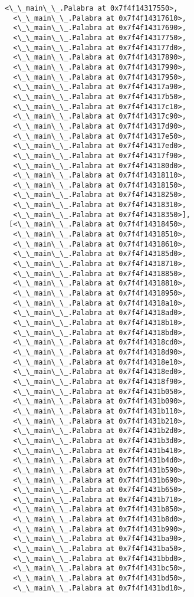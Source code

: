 \documentclass[12pt,a4paper,table]{article}
\begin{document}
\begin{tcolorbox}[breakable, size=fbox, boxrule=.5pt, pad at break*=1mm, opacityfill=0]
\begin{Verbatim}[commandchars=\\\{\}]
  <\_\_main\_\_.Palabra at 0x7f4f14317550>,
  <\_\_main\_\_.Palabra at 0x7f4f14317610>,
  <\_\_main\_\_.Palabra at 0x7f4f14317690>,
  <\_\_main\_\_.Palabra at 0x7f4f14317750>,
  <\_\_main\_\_.Palabra at 0x7f4f143177d0>,
  <\_\_main\_\_.Palabra at 0x7f4f14317890>,
  <\_\_main\_\_.Palabra at 0x7f4f14317990>,
  <\_\_main\_\_.Palabra at 0x7f4f14317950>,
  <\_\_main\_\_.Palabra at 0x7f4f14317a90>,
  <\_\_main\_\_.Palabra at 0x7f4f14317b50>,
  <\_\_main\_\_.Palabra at 0x7f4f14317c10>,
  <\_\_main\_\_.Palabra at 0x7f4f14317c90>,
  <\_\_main\_\_.Palabra at 0x7f4f14317d90>,
  <\_\_main\_\_.Palabra at 0x7f4f14317e50>,
  <\_\_main\_\_.Palabra at 0x7f4f14317ed0>,
  <\_\_main\_\_.Palabra at 0x7f4f14317f90>,
  <\_\_main\_\_.Palabra at 0x7f4f143180d0>,
  <\_\_main\_\_.Palabra at 0x7f4f14318110>,
  <\_\_main\_\_.Palabra at 0x7f4f14318150>,
  <\_\_main\_\_.Palabra at 0x7f4f14318250>,
  <\_\_main\_\_.Palabra at 0x7f4f14318310>,
  <\_\_main\_\_.Palabra at 0x7f4f14318350>],
 [<\_\_main\_\_.Palabra at 0x7f4f14318450>,
  <\_\_main\_\_.Palabra at 0x7f4f14318510>,
  <\_\_main\_\_.Palabra at 0x7f4f14318610>,
  <\_\_main\_\_.Palabra at 0x7f4f143185d0>,
  <\_\_main\_\_.Palabra at 0x7f4f14318710>,
  <\_\_main\_\_.Palabra at 0x7f4f14318850>,
  <\_\_main\_\_.Palabra at 0x7f4f14318810>,
  <\_\_main\_\_.Palabra at 0x7f4f14318950>,
  <\_\_main\_\_.Palabra at 0x7f4f14318a10>,
  <\_\_main\_\_.Palabra at 0x7f4f14318ad0>,
  <\_\_main\_\_.Palabra at 0x7f4f14318b10>,
  <\_\_main\_\_.Palabra at 0x7f4f14318bd0>,
  <\_\_main\_\_.Palabra at 0x7f4f14318cd0>,
  <\_\_main\_\_.Palabra at 0x7f4f14318d90>,
  <\_\_main\_\_.Palabra at 0x7f4f14318e10>,
  <\_\_main\_\_.Palabra at 0x7f4f14318ed0>,
  <\_\_main\_\_.Palabra at 0x7f4f14318f90>,
  <\_\_main\_\_.Palabra at 0x7f4f1431b050>,
  <\_\_main\_\_.Palabra at 0x7f4f1431b090>,
  <\_\_main\_\_.Palabra at 0x7f4f1431b110>,
  <\_\_main\_\_.Palabra at 0x7f4f1431b210>,
  <\_\_main\_\_.Palabra at 0x7f4f1431b2d0>,
  <\_\_main\_\_.Palabra at 0x7f4f1431b3d0>,
  <\_\_main\_\_.Palabra at 0x7f4f1431b410>,
  <\_\_main\_\_.Palabra at 0x7f4f1431b4d0>,
  <\_\_main\_\_.Palabra at 0x7f4f1431b590>,
  <\_\_main\_\_.Palabra at 0x7f4f1431b690>,
  <\_\_main\_\_.Palabra at 0x7f4f1431b650>,
  <\_\_main\_\_.Palabra at 0x7f4f1431b710>,
  <\_\_main\_\_.Palabra at 0x7f4f1431b850>,
  <\_\_main\_\_.Palabra at 0x7f4f1431b8d0>,
  <\_\_main\_\_.Palabra at 0x7f4f1431b990>,
  <\_\_main\_\_.Palabra at 0x7f4f1431ba90>,
  <\_\_main\_\_.Palabra at 0x7f4f1431ba50>,
  <\_\_main\_\_.Palabra at 0x7f4f1431bbd0>,
  <\_\_main\_\_.Palabra at 0x7f4f1431bc50>,
  <\_\_main\_\_.Palabra at 0x7f4f1431bd50>,
  <\_\_main\_\_.Palabra at 0x7f4f1431bd10>,

\end{Verbatim}
\end{tcolorbox}
\end{document}
